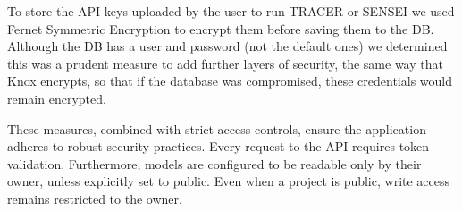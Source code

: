 To store the \ac{API} keys uploaded by the user to run \ac{TRACER} or SENSEI
we used Fernet Symmetric Encryption \autocite{FernetSymmetricEncryption}
to encrypt them before saving them to the \ac{DB}.
Although the \ac{DB} has a user and password (not the default ones)
we determined this was a prudent measure to add further layers of security,
the same way that Knox encrypts, so that
if the database was compromised, these credentials would remain encrypted.

These measures, combined with strict access controls,
ensure the application adheres to robust security practices.
Every request to the \ac{API} requires token validation.
Furthermore, models are configured to be readable only by their owner,
unless explicitly set to public.
Even when a project is public, write access remains restricted to the owner.
